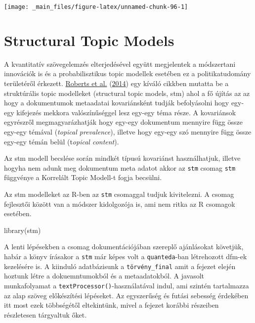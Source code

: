 \documentclass[
]{book}
\newenvironment{Shaded}{\begin{snugshade}}{\end{snugshade}}
\newcommand{\FunctionTok}[1]{\textcolor[rgb]{0.00,0.00,0.00}{#1}}
\newcommand{\NormalTok}[1]{#1}
\begin{document}
\begin{center}\texttt{[image: \_main\_files/figure-latex/unnamed-chunk-96-1]} \end{center}

\hypertarget{structural-topic-models}{%
\chapter{Structural Topic Models}\label{structural-topic-models}}

A kvantitatív szövegelemzés elterjedésével együtt megjelentek a
módszertani innovációk is és a probabilisztikus topic modellek esetében
ez a politikatudomány területéről érkezett.
\protect\hyperlink{ref-roberts2014structural}{Roberts et al.}
(\protect\hyperlink{ref-roberts2014structural}{2014}) egy kíváló cikkben
mutatta be a struktúrális topic modelleket (structural topic models,
stm) ahol a fő újítás az az hogy a dokumentumok metaadatai kovariánsként
tudják befolyásolni hogy egy-egy kifejezés mekkora valószínűséggel lesz
egy-egy téma része. A kovariánsok egyrészről megmagyarázhatják hogy
egy-egy dokumentum mennyire függ össze egy-egy témával (\emph{topical
prevalence}), illetve hogy egy-egy szó mennyire függ össze egy-egy témán
belül (t\emph{opical content}).

Az stm modell becslése során mindkét típusú kovariánst használhatjuk,
illetve hogyha nem adunk meg dokumentum meta adatot akkor az
\texttt{stm} csomag \texttt{stm} függvénye a Korrelált Topic Modell-t
fogja becsülni.

Az stm modelleket az R-ben az \texttt{stm} csomaggal tudjuk kivitelezni.
A csomag fejlesztői között van a módszer kidolgozója is, ami nem ritka
az R csomagok esetében.

\begin{Shaded}
\begin{Highlighting}[]
\FunctionTok{library}\NormalTok{(stm)}
\end{Highlighting}
\end{Shaded}

A lenti lépésekben a csomag dokumentációjában szereplő ajánlásokat
követjük, habár a könyv írásakor a \texttt{stm} már képes volt a
\texttt{quanteda}-ban létrehozott dfm-ek kezelésére is. A kiinduló
adatbázisunk a \texttt{törvény\_final} amit a fejezet elején hoztunk
létre a dokuemntumokból és a metaadatokból. A javasolt munkafolyamat a
\texttt{textProcessor()}-használatával indul, ami szintén tartalmazza az
alap szöveg előkészítési lépéseket. Az egyszerűség és futási sebesség
érdekében itt most ezek többségétől eltekintünk, mivel a fejezet korábbi
részeiben részletesen tárgyaltuk őket.
\end{document}

